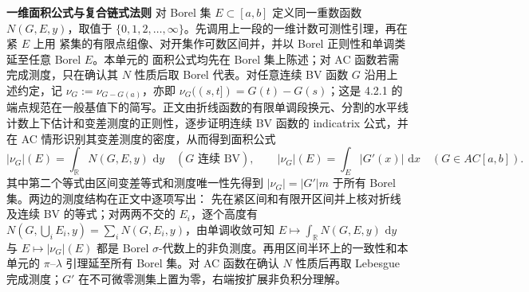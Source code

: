 \documentclass[11pt,a4paper]{ctexart}
\newcommand{\R}{\mathbb R}
\newcommand{\dd}{\,\mathrm d}
\newcommand{\planitem}[1]{\par\smallskip\noindent\textcolor{deepblue}{\textbf{#1}}\quad}
\begin{document}
\planitem{一维面积公式与复合链式法则}
对 Borel 集 $E\subset[a,b]$ 定义同一重数函数 $N(G,E,y)$，取值于
$\{0,1,2,\ldots,\infty\}$。先调用上一段的一维计数可测性引理，再在紧 $E$ 上用
紧集的有限点组像、对开集作可数区间并，并以 Borel 正则性和单调类延至任意 Borel
$E$。本单元的
面积公式均先在 Borel 集上陈述；对 AC 函数若需完成测度，只在确认其 $N$ 性质后取
Borel 代表。对任意连续 BV 函数 $G$ 沿用上述约定，记
$\nu_G:=\nu_{G-G(a)}$，亦即 $\nu_G((s,t])=G(t)-G(s)$；这是
4.2.1 的端点规范在一般基值下的简写。正文由折线函数的有限单调段换元、分割的水平线
计数上下估计和变差测度的正则性，逐步证明连续 BV 函数的 indicatrix 公式，并在 AC
情形识别其变差测度的密度，从而得到面积公式
\[
|\nu_G|(E)=\int_\R N(G,E,y)\,\dd y\quad(G\text{ 连续 BV}),
\qquad
|\nu_G|(E)=\int_E|G'(x)|\,\dd x\quad(G\in AC[a,b]).
\]
其中第二个等式由区间变差等式和测度唯一性先得到
$|\nu_G|=|G'|m$ 于所有 Borel 集。两边的测度结构在正文中逐项写出：
先在紧区间和有限开区间并上核对折线及连续 BV 的等式；对两两不交的
$E_i$，逐个高度有 $N(G,\bigcup_iE_i,y)=\sum_iN(G,E_i,y)$，由单调收敛可知
$E\mapsto\int_\R N(G,E,y)\,\dd y$ 与 $E\mapsto|\nu_G|(E)$ 都是 Borel
$\sigma$-代数上的非负测度。再用区间半环上的一致性和本单元的
$\pi$--$\lambda$ 引理延至所有 Borel 集。对 AC 函数在确认 $N$ 性质后再取
Lebesgue 完成测度；$G'$ 在不可微零测集上置为零，右端按扩展非负积分理解。
\end{document}
